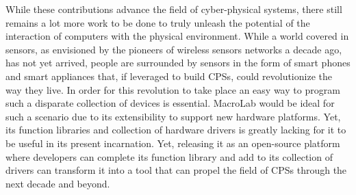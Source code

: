 While these contributions advance the field of cyber-physical systems, there
still remains a lot more work to be done to truly unleash the potential of the
interaction of computers with the physical environment. While a world covered in
sensors, as envisioned by the pioneers of wireless sensors networks a decade
ago, has not yet arrived, people are surrounded by sensors in the form of smart
phones and smart appliances that, if leveraged to build CPSs, could
revolutionize the way they live. In order for this revolution to take place an
easy way to program such a disparate collection of devices is
essential. MacroLab would be ideal for such a scenario due to its extensibility
to support new hardware platforms. Yet, its function libraries and collection of
hardware drivers is greatly lacking for it to be useful in its present
incarnation. Yet, releasing it as an open-source platform where developers can
complete its function library and add to its collection of drivers can transform
it into a tool that can propel the field of CPSs through the next decade and
beyond.
